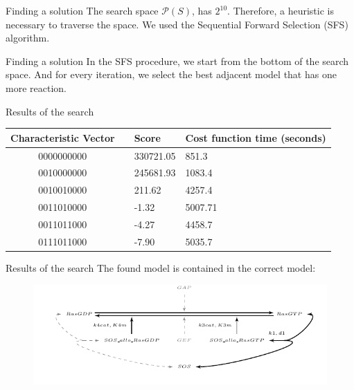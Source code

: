 \documentclass{beamer}
\newcommand{\powerset}{\mathcal{P}}
\begin{document}
\begin{frame}{Finding a solution}
The search space $\powerset(S)$, has $2^{10}$. Therefore, a heuristic 
is necessary to traverse the space. \pause We used the Sequential 
Forward Selection (SFS) algorithm.
\end{frame}


\begin{frame}{Finding a solution}
In the SFS procedure, we start from the bottom of the search space.
\pause And for every iteration, we select the best adjacent model that
has one more reaction.
\end{frame}


\begin{frame}{Results of the search}
\begin{table}
\centering
\begin{tabular}{c|cll}
\hline
Characteristic Vector && \multicolumn{1}{l}{Score} &
\multicolumn{1}{l}{Cost function time (seconds)} \\
\hline
    0000000000 && 330721.05	& 851.3	    \\
    0010000000 && 245681.93	& 1083.4	\\
    0010010000 && 211.62	& 4257.4	\\
    0011010000 && -1.32	    & 5007.71	\\
    0011011000 && -4.27	    & 4458.7	\\  
    \alert{0111011000} && \alert{-7.90}	    & \alert{5035.7}	\\  
\hline
\hline
\end{tabular}
\end{table}
\end{frame}

\begin{frame}{Results of the search}
The found model is contained in the correct model: \pause
\begin{figure}
\includegraphics[width=1\textwidth]{experiments/ras_switch/solution.pdf}
\end{figure}
\end{frame}
\end{document}
